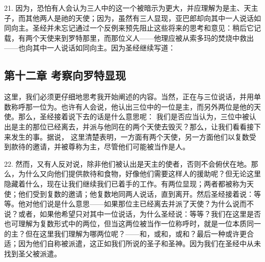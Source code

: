 21. 因为，恐怕有人会认为三人中的这一个被暗示为更大，并应理解为是主、天主子，而其他两人是祂的天使；因为，虽然有三人显现，亚巴郎却向其中一人说话如同向主。圣经并未忘记通过一个反例来预先阻止这些将来的思考和意见：稍后它记载，有两个天使来到罗特那里，而那位义人——他理应被从索多玛的焚烧中救出——也向其中一人说话如同向主。因为圣经继续写道：\par


\subsection{第十二章 考察向罗特显现}

 这里，我们必须更仔细地思考我开始阐述的内容。当然，正在与三位说话，并用单数称呼那一位为。也许有人会说，他认出三位中的一位是主，而另外两位是他的天使。那么，圣经接着说下去的话是什么意思呢： 我们是否应当认为，三位中被认出是主的那位已经离去，并派与他同在的两个天使去毁灭？那么，让我们看看接下来发生的事。据说， 这里清楚表明，一方面有两个天使，另一方面他们以复数受到款待的邀请，并被尊称为主，尽管他们可能被当作是人。\par

22. 然而，又有人反对说，除非他们被认出是天主的使者，否则不会俯伏在地。那么，为什么又向他们提供款待和食物，好像他们需要这样人的援助呢？但无论这里隐藏着什么，现在让我们继续我们已着手的工作。有两位显现；两者都被称为天使；他们受到复数的邀请；他复数地同两人说话，直到离开。然后圣经接着说：等等。他对他们说是什么意思——如果那位主已经离去并派了天使？为什么说而不说？或者，如果他希望只对其中一位说话，为什么圣经说：等等？我们在这里是否也可理解为复数形式中的两位，但当这两位被当作一位称呼时，就是一位本质同一的主？但在这里我们理解为哪两位呢？——和，或和，或和？最后一种或许更合适；因为他们自称被派遣，这正如我们所说的圣子和圣神。因为我们在圣经中从未找到圣父被派遣。\par


